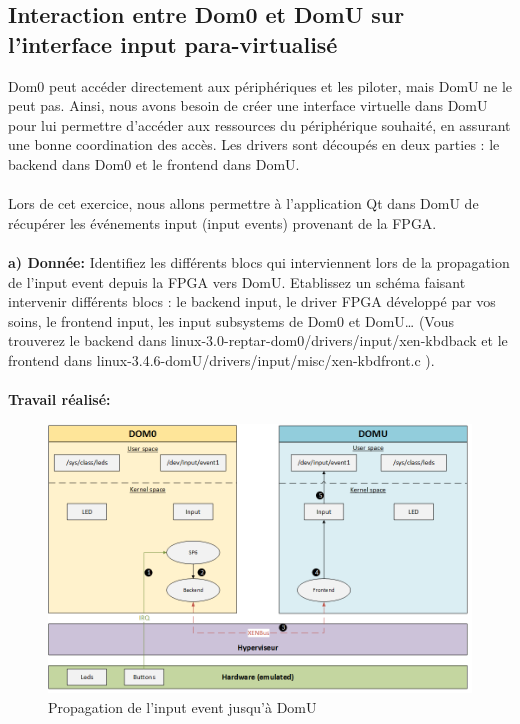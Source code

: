\subsection{Interaction entre Dom0 et DomU sur l'interface input para-virtualisé}
Dom0 peut accéder directement aux périphériques et les piloter, mais DomU ne le peut pas. Ainsi, nous
avons besoin de créer une interface virtuelle dans DomU pour lui permettre d’accéder aux ressources
du périphérique souhaité, en assurant une bonne coordination des accès. Les drivers sont découpés en
deux parties : le backend dans Dom0 et le frontend dans DomU.\\\\
Lors de cet exercice, nous allons permettre à l’application Qt dans DomU de récupérer les événements
input (input events) provenant de la FPGA.\\\\
\textbf{a) Donnée: }Identifiez les différents blocs qui interviennent lors de la propagation de l’input event depuis la
FPGA vers DomU. Etablissez un schéma faisant intervenir différents blocs : le backend input, le
driver FPGA développé par vos soins, le frontend input, les input subsystems de Dom0 et DomU…
(Vous trouverez le backend dans linux-3.0-reptar-dom0/drivers/input/xen-kbdback et le frontend
dans linux-3.4.6-domU/drivers/input/misc/xen-kbdfront.c ).\\\\
\textbf{Travail réalisé: }
\begin{figure}[H]
	\begin{center}
		\includegraphics[width=17cm]{img/virt1.png}
		\caption{Propagation de l'input event jusqu'à DomU}
		\label{virt1}
	\end{center}
\end{figure}
